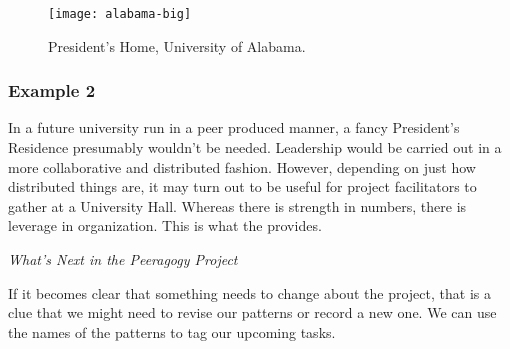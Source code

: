 \begingroup
\setlength{\columnsep}{6pt}%

\begin{wrapfigure}{r}{.32\textwidth}
\vspace{-.9cm}
{\centering
\texttt{[image: alabama-big]}

\par}
\vspace{-.5cm}
\caption{President's Home, University of Alabama.
\label{presidents-home}}
\vspace{-.8cm}
\end{wrapfigure}

\subsubsection*{Example 2}
In a future university run in a peer produced manner, a fancy
President's Residence presumably wouldn't be needed.  Leadership would
be carried out in a more collaborative and distributed fashion.
However, depending on just how distributed things are, it may turn out
to be useful for project facilitators to gather at a University Hall.
Whereas there is strength in numbers, there is leverage in
organization.  This is what the  provides.

\endgroup

\smallskip

\begin{framed}
\noindent
\emph{What's Next in the Peeragogy Project}
\begin{collectinmacro}{\RoadmapWN}{}{}
If it becomes clear that something needs to change about the project, that is a clue that we might need to revise our patterns or record a new one.  We can use the names of the patterns to tag our upcoming tasks.
\end{collectinmacro}
\RoadmapWN
\end{framed}


\newpage
